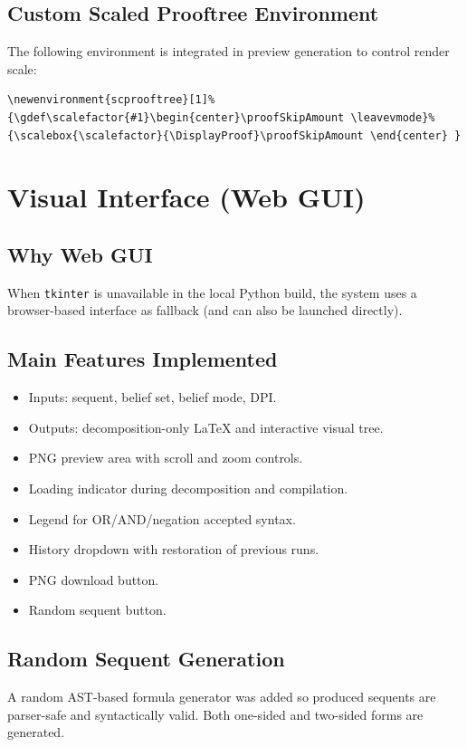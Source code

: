 \documentclass[11pt,a4paper]{article}
\begin{document}
\subsection{Custom Scaled Prooftree Environment}
The following environment is integrated in preview generation to control render scale:
\begin{verbatim}
\newenvironment{scprooftree}[1]%
{\gdef\scalefactor{#1}\begin{center}\proofSkipAmount \leavevmode}%
{\scalebox{\scalefactor}{\DisplayProof}\proofSkipAmount \end{center} }
\end{verbatim}

\section{Visual Interface (Web GUI)}
\subsection{Why Web GUI}
When \texttt{tkinter} is unavailable in the local Python build, the system uses a browser-based interface as fallback (and can also be launched directly).

\subsection{Main Features Implemented}
\begin{itemize}[leftmargin=1.5em]
  \item Inputs: sequent, belief set, belief mode, DPI.
  \item Outputs: decomposition-only LaTeX and interactive visual tree.
  \item PNG preview area with scroll and zoom controls.
  \item Loading indicator during decomposition and compilation.
  \item Legend for OR/AND/negation accepted syntax.
  \item History dropdown with restoration of previous runs.
  \item PNG download button.
  \item Random sequent button.
\end{itemize}

\subsection{Random Sequent Generation}
A random AST-based formula generator was added so produced sequents are parser-safe and syntactically valid. Both one-sided and two-sided forms are generated.
\end{document}
